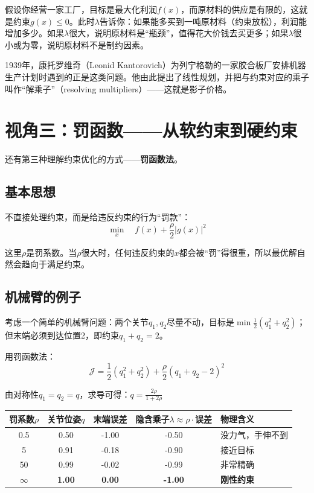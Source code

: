 假设你经营一家工厂，目标是最大化利润$f(x)$，而原材料的供应是有限的，这就是约束$g(x) \leq 0$。此时$\lambda$告诉你：如果能多买到一吨原材料（约束放松），利润能增加多少。如果$\lambda$很大，说明原材料是“瓶颈”，值得花大价钱去买更多；如果$\lambda$很小或为零，说明原材料不是制约因素。

1939年，康托罗维奇（Leonid Kantorovich）为列宁格勒的一家胶合板厂安排机器生产计划时遇到的正是这类问题。他由此提出了线性规划，并把与约束对应的乘子叫作“解乘子”（resolving multipliers）——这就是影子价格。


\section{视角三：罚函数——从软约束到硬约束}

还有第三种理解约束优化的方式——\textbf{罚函数法}。

\subsection{基本思想}

不直接处理约束，而是给违反约束的行为“罚款”：
\[
\min_x \quad f(x) + \frac{\rho}{2} |g(x)|^2
\]

这里$\rho$是罚系数。当$\rho$很大时，任何违反约束的$x$都会被“罚”得很重，所以最优解自然会趋向于满足约束。

\subsection{机械臂的例子}

考虑一个简单的机械臂问题：两个关节$q_1, q_2$尽量不动，目标是$\min \frac{1}{2}(q_1^2+q_2^2)$；但末端必须到达位置2，即约束$q_1 + q_2 = 2$。

用罚函数法：
\[
\mathcal{J} = \frac{1}{2}(q_1^2+q_2^2) + \frac{\rho}{2}(q_1+q_2-2)^2
\]

由对称性$q_1 = q_2 = q$，求导可得：$q = \frac{2\rho}{1+2\rho}$

\begin{center}
\small
\begin{tabularx}{\textwidth}{ccccX}
\toprule
罚系数$\rho$ & 关节位姿$q$ & 末端误差 & 隐含乘子$\lambda \approx \rho \cdot$误差 & 物理含义 \\
\midrule
0.5 & 0.50 & -1.00 & -0.50 & 没力气，手伸不到 \\
5 & 0.91 & -0.18 & -0.90 & 接近目标 \\
50 & 0.99 & -0.02 & -0.99 & 非常精确 \\
$\mathbf{\infty}$ & \textbf{1.00} & \textbf{0.00} & \textbf{-1.00} & \textbf{刚性约束} \\
\bottomrule
\end{tabularx}
\end{center}

